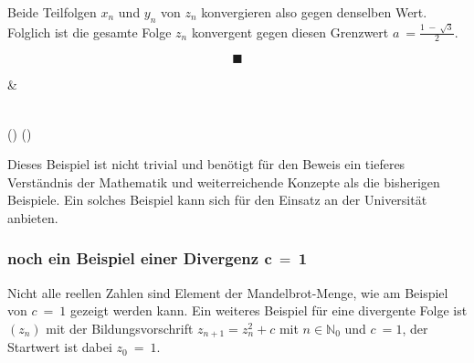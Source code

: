 \documentclass[a4paper, 12pt]{book}
\begin{document}
\begin{longtable}[]
\begin{minipage}[b]{\linewidth}
Beide Teilfolgen \(x_{n}\) und \(y_{n}\) von \(z_{n}\) konvergieren also
gegen denselben Wert. Folglich ist die gesamte Folge \(z_{n}\)
konvergent gegen diesen Grenzwert \(a\  = \frac{1\  - \ \sqrt{3}}{2}\).

\[\blacksquare\]
\end{minipage} & \begin{minipage}[b]{\linewidth}\raggedright
\end{minipage} \\
\midrule()
\endhead
\bottomrule()
\end{longtable}

Dieses Beispiel ist nicht trivial und benötigt für den Beweis ein
tieferes Verständnis der Mathematik und weiterreichende Konzepte als die
bisherigen Beispiele. Ein solches Beispiel kann sich für den Einsatz an
der Universität anbieten.

\hypertarget{noch-ein-beispiel-einer-divergenz-mathbfc-1}{%
\subsubsection{\texorpdfstring{noch ein Beispiel einer Divergenz
\(\mathbf{c\  = \ 1}\)}{noch ein Beispiel einer Divergenz \textbackslash mathbf\{c\textbackslash{}  = \textbackslash{} 1\}}}\label{noch-ein-beispiel-einer-divergenz-mathbfc-1}}

Nicht alle reellen Zahlen sind Element der Mandelbrot-Menge, wie am
Beispiel von \(c\  = \ 1\) gezeigt werden kann. Ein weiteres Beispiel
für eine divergente Folge ist \(\left( z_{n} \right)\) mit der
Bildungsvorschrift \(z_{n + 1} = z_{n}^{2} + c\) mit
\(n \in \mathbb{N}_{0}\) und \(c\  = 1\), der Startwert ist dabei
\(z_{0}\  = \ 1\).
\end{document}

